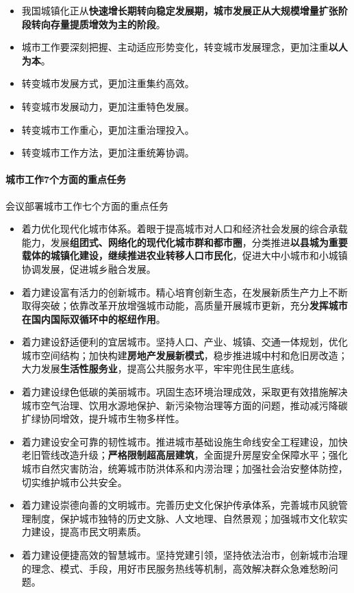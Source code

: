 \begin{itemize}
    \item 我国城镇化正从\textbf{快速增长期转向稳定发展期，城市发展正从大规模增量扩张阶段转向存量提质增效为主的阶段}。
    \item 城市工作要深刻把握、主动适应形势变化，转变城市发展理念，更加注重\textbf{以人为本}。
    \item 转变城市发展方式，更加注重集约高效。
    \item 转变城市发展动力，更加注重特色发展。
    \item 转变城市工作重心，更加注重治理投入。
    \item 转变城市工作方法，更加注重统筹协调。
\end{itemize}

\paragraph{城市工作7个方面的重点任务} 会议部署城市工作七个方面的重点任务

\begin{itemize}
    \item 着力优化现代化城市体系。着眼于提高城市对人口和经济社会发展的综合承载能力，发展\textbf{组团式、网络化的现代化城市群和都市圈}，分类推进\textbf{以县城为重要载体的城镇化建设，继续推进农业转移人口市民化}，促进大中小城市和小城镇协调发展，促进城乡融合发展。
    \item 着力建设富有活力的创新城市。精心培育创新生态，在发展新质生产力上不断取得突破；依靠改革开放增强城市动能，高质量开展城市更新，充分\textbf{发挥城市在国内国际双循环中的枢纽作用}。
    \item 着力建设舒适便利的宜居城市。坚持人口、产业、城镇、交通一体规划，优化城市空间结构；加快构建\textbf{房地产发展新模式}，稳步推进城中村和危旧房改造；大力发展\textbf{生活性服务业}，提高公共服务水平，牢牢兜住民生底线。
    \item 着力建设绿色低碳的美丽城市。巩固生态环境治理成效，采取更有效措施解决城市空气治理、饮用水源地保护、新污染物治理等方面的问题，推动减污降碳扩绿协同增效，提升城市生物多样性。
    \item 着力建设安全可靠的韧性城市。推进城市基础设施生命线安全工程建设，加快老旧管线改造升级；\textbf{严格限制超高层建筑}，全面提升房屋安全保障水平；强化城市自然灾害防治，统筹城市防洪体系和内涝治理；加强社会治安整体防控，切实维护城市公共安全。
    \item 着力建设崇德向善的文明城市。完善历史文化保护传承体系，完善城市风貌管理制度，保护城市独特的历史文脉、人文地理、自然景观；加强城市文化软实力建设，提高市民文明素质。
    \item 着力建设便捷高效的智慧城市。坚持党建引领，坚持依法治市，创新城市治理的理念、模式、手段，用好市民服务热线等机制，高效解决群众急难愁盼问题。
\end{itemize}

